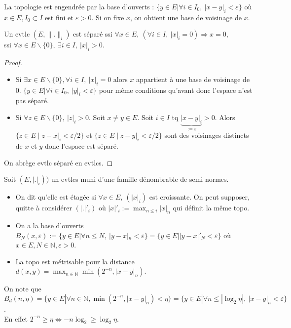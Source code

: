 La topologie est engendrée par la base d'ouverts : $\{y\in E|\forall i\in I_0,\ |x-y|_i<\varepsilon  \} $ où $x\in E, I_0\subset I$ est fini et $\varepsilon >0$. Si on fixe $x$, on obtient une base de voisinage de $x$.

\begin{lemme}
    Un evtlc $(E,\|.\|_i)$ est séparé ssi $\forall x\in E, \ (\forall i\in I,\ |x|_i=0)\Rightarrow x=0  $, \\
    ssi $\forall x\in E\backslash \{0\} ,\ \exists i\in I,\ |x|_i>0. $
\end{lemme}
\begin{proof}
    \begin{itemize}
        \item Si $\exists x\in E\backslash \{0\} ,\forall i\in I, \ |x|_i=0 $ alors $x$ appartient à une base de voisinage de $0$. $\{y\in E|\forall i\in I_0,\ |y|_i<\varepsilon  \} $ pour même conditions qu'avant donc l'espace n'est pas séparé.
        \item Si $\forall z\in E\backslash \{0\} ,\ |z|_i>0 $. Soit $x\neq y\in E$. Soit $i\in I$ tq $\underbrace{|x-y|_i}_{:=\varepsilon} >0$. Alors $\{z\in E\mid z-x|_i<\varepsilon /2\} $ et $\{z\in E\mid z-y|_i<\varepsilon /2\} $ sont des voisinages distincts de $x$ et $y$ donc l'espace est séparé.
    \end{itemize}
    On abrège evtlc séparé en evtlcs.
\end{proof}

Soit $(E,|.|_i))$ un evtlcs muni d'une famille dénombrable de semi normes.
\begin{itemize}
    \item On dit qu'elle est étagée si $\forall x\in E,\ (|x|_i) $ est croissante. On peut supposer, quitte à considérer $(|.|'_i)$ où $|x|'_i:=\max_{n\le i }|x|_n$ qui définit la même topo.
    \item On a la base d'ouverts $B_N(x,\varepsilon ):=\{y\in E|\forall n\le N,\ |y-x|_n<\varepsilon  \} =\{y\in E| |y-x|'_N<\varepsilon \} $ où $x\in E, N\in \mathbb{N} ,\varepsilon >0$.
    \item La topo est métrisable pour la distance $d(x,y)=\max_{n\in \mathbb{N} }\min(2^{-n}, |x-y|_n)$.
\end{itemize}

On note que $B_d(n, \eta)=\{y\in E| \forall n\in \mathbb{N} , \min(2^{-n},|x-y|_n)< \eta\} =\{y\in E| \forall n\le |\log_2\eta|,\ |x-y|_n<\varepsilon  \} $.\\
En effet $2^{-n}\ge \eta\Leftrightarrow -n\log_2\ge  \log_2\eta$.\\

